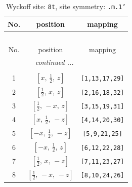 \documentclass[fleqn,8pt]{jsarticle}
\begin{document}
\begin{longtable}{ccc}
\caption{Wyckoff site: {\tt 8t}, site symmetry: {\tt .m.1'}}
 \\
 \hline \hline
No. & position & mapping \\ \hline \endfirsthead

\multicolumn{2}{l}{\tablename\ \thetable{}} \\
 \hline \hline
No. & position & mapping \\ \hline \endhead

 \hline \hline
\multicolumn{2}{r}{\footnotesize\it continued ...} \\ \endfoot

 \hline \hline
\multicolumn{2}{r}{} \\ \endlastfoot

1 & $\left[ x,\, \frac{1}{2},\, z \right]$ & {\tt [1,13,17,29]} \\ \hline
2 & $\left[ \frac{1}{2},\, x,\, z \right]$ & {\tt [2,16,18,32]} \\ \hline
3 & $\left[ \frac{1}{2},\, - x,\, z \right]$ & {\tt [3,15,19,31]} \\ \hline
4 & $\left[ x,\, \frac{1}{2},\, - z \right]$ & {\tt [4,14,20,30]} \\ \hline
5 & $\left[ - x,\, \frac{1}{2},\, - z \right]$ & {\tt [5,9,21,25]} \\ \hline
6 & $\left[ - x,\, \frac{1}{2},\, z \right]$ & {\tt [6,12,22,28]} \\ \hline
7 & $\left[ \frac{1}{2},\, x,\, - z \right]$ & {\tt [7,11,23,27]} \\ \hline
8 & $\left[ \frac{1}{2},\, - x,\, - z \right]$ & {\tt [8,10,24,26]} \\
\end{longtable}
\renewcommand{\arraystretch}{1.2}
\end{document}
